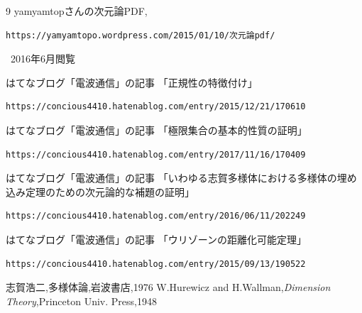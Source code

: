 \documentclass[leqno, a4paper, 12pt]{jsarticle}
\begin{document}
	
\begin{thebibliography}{9}
yamyamtopさんの次元論PDF,
\begin{verbatim}
https://yamyamtopo.wordpress.com/2015/01/10/次元論pdf/
\end{verbatim}
\ 2016年6月閲覧

はてなブログ「電波通信」の記事
「正規性の特徴付け」
\begin{verbatim}
https://concious4410.hatenablog.com/entry/2015/12/21/170610
\end{verbatim}

はてなブログ「電波通信」の記事
「極限集合の基本的性質の証明」
\begin{verbatim}
https://concious4410.hatenablog.com/entry/2017/11/16/170409
\end{verbatim}

はてなブログ「電波通信」の記事
「いわゆる志賀多様体における多様体の埋め込み定理のための次元論的な補題の証明」
\begin{verbatim}
https://concious4410.hatenablog.com/entry/2016/06/11/202249
\end{verbatim}

はてなブログ「電波通信」の記事
「ウリゾーンの距離化可能定理」
\begin{verbatim}
https://concious4410.hatenablog.com/entry/2015/09/13/190522
\end{verbatim}

志賀浩二,多様体論,岩波書店,1976
W.Hurewicz and H.Wallman,\textit{Dimension Theory},Princeton Univ. Press,1948
\end{thebibliography}




			
\end{document}
